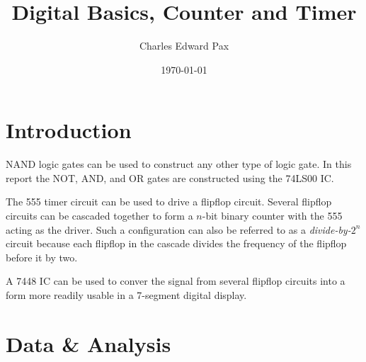 \documentclass[11pt,onecolumn,letter]{article}
\begin{document}
\title{Digital Basics, Counter and Timer}
\date{\today}
\author{Charles Edward Pax}
\maketitle


\section{Introduction}\label{sec:Introduction}
NAND logic gates can be used to construct any other type of logic gate. In this report the NOT, AND, and OR gates are constructed using the 74LS00 IC.

The 555 timer circuit can be used to drive a flipflop circuit. Several flipflop circuits can be cascaded together to form a $n$-bit binary counter with the 555 acting as the driver. Such a configuration can also be referred to as a {\em divide-by-$2^n$} circuit because each flipflop in the cascade divides the frequency of the flipflop before it by two.

A 7448 IC can be used to conver the signal from several flipflop circuits into a form more readily usable in a 7-segment digital display.

\section{Data \& Analysis}\label{sec:DataAnalysis}
%
%
\end{document}
